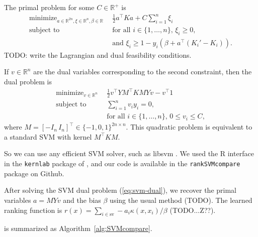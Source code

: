 \documentclass{article}
\newcommand{\RR}{\mathbb R}
\DeclareMathOperator*{\minimize}{minimize}
\begin{document}
The primal problem for some $C\in\RR^+$ is
\begin{equation}
  \begin{aligned}
      \minimize_{a\in\RR^{2n},\xi\in\RR^n,\beta\in\RR}\ \ & 
      \frac 1 2 a^\intercal K a + C\sum_{i=1}^n \xi_i \\
      \text{subject to}\ \ & 
      \text{for all $i\in\{1,\dots,n\}$, }
      \xi_i \geq 0,\\
      &\text{and }
      \xi_i \geq 1-y_i(\beta + a^\intercal (K_i'-K_i)).
  \end{aligned}
\end{equation}
TODO: write the Lagrangian and dual feasibility conditions.

If $v\in\RR^n$ are the dual variables corresponding to the second
constraint, then the dual problem is
\begin{equation}
  \begin{aligned}
    \label{eq:svm-dual}
    \minimize_{v\in\RR^n}\ \ &
    \frac 1 2 v^\intercal Y M^\intercal K M Y v - v^\intercal 1\\
    \text{subject to}\ \ &
    \sum_{i=1}^n v_i y_i = 0,\\
&    \text{for all $i\in\{1,\dots,n\}$, } 0\leq v_i\leq C,
  \end{aligned}
\end{equation}
where $M=[-I_n \, I_n]^\intercal\in\{-1,0,1\}^{2n\times n}$. This quadratic problem
is equivalent to a standard SVM with kernel $M^\intercal K M$.

So we can use any efficient SVM solver, such as libsvm
\citep{libsvm}. We used the R interface in the \texttt{kernlab}
package of \citet{kernlab}, and our code is available in the
\texttt{rankSVMcompare} package on Github.

After solving the SVM dual problem (\ref{eq:svm-dual}), we recover the
primal variables $a = MYv$ and the bias $\beta$ using the usual method
(TODO). The learned ranking function is $r(x) = \sum_{i\in\text{sv}}
-a_i \kappa(x, x_i)/\beta$ (TODO...Z??).

 is summarized as Algorithm~\ref{alg:SVMcompare}.
\end{document}
